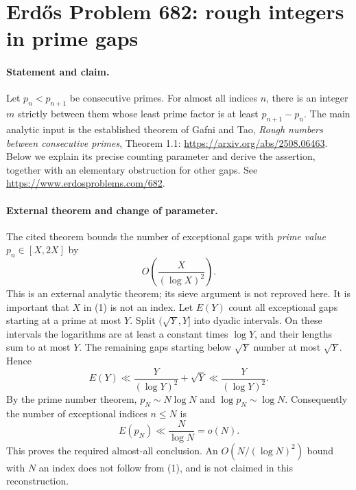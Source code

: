 \section*{Erd\H{o}s Problem 682: rough integers in prime gaps}

\paragraph{Statement and claim.}
Let \(p_n<p_{n+1}\) be consecutive primes. For almost all indices
\(n\), there is an integer \(m\) strictly between them whose least
prime factor is at least \(p_{n+1}-p_n\).
The main analytic input is the established theorem of Gafni and Tao,
\emph{Rough numbers between consecutive primes}, Theorem 1.1:
\url{https://arxiv.org/abs/2508.06463}.
Below we explain its precise counting parameter and derive the
assertion, together with an elementary obstruction for other gaps.
See \url{https://www.erdosproblems.com/682}.

\paragraph{External theorem and change of parameter.}
The cited theorem bounds the number of exceptional gaps with
\emph{prime value} \(p_n\in[X,2X]\) by
\[
 O\left(\frac X{(\log X)^2}\right).                             \tag{1}
\]
This is an external analytic theorem; its sieve argument is not
reproved here. It is important that \(X\) in (1) is not an index.
Let \(E(Y)\) count all exceptional gaps starting at a prime at
most \(Y\). Split \((\sqrt Y,Y]\) into dyadic intervals. On these
intervals the logarithms are at least a constant times \(\log Y\),
and their lengths sum to at most \(Y\). The remaining gaps
starting below \(\sqrt Y\) number at most \(\sqrt Y\). Hence
\[
 E(Y)\ll \frac Y{(\log Y)^2}+\sqrt Y
       \ll\frac Y{(\log Y)^2}.                                  \tag{2}
\]
By the prime number theorem, \(p_N\sim N\log N\) and
\(\log p_N\sim\log N\). Consequently the number of exceptional
indices \(n\leq N\) is
\[
 E(p_N)\ll \frac N{\log N}=o(N).                                \tag{3}
\]
This proves the required almost-all conclusion.
An \(O(N/(\log N)^2)\) bound with \(N\) an index does not follow
from (1), and is not claimed in this reconstruction.


